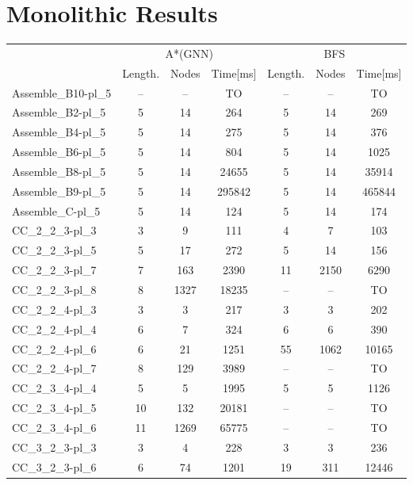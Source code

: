 \documentclass{article}
\newcommand{\BFSres}{BFS}
\newcommand{\GNNres}{A*(GNN)}
\newcommand{\planLength}{Length.}
\newcommand{\nodesExp}{Nodes}
\newcommand{\solvingTime}{Time}
\newcommand{\unsolvedColumn}{--}
\newcommand{\myTO}{TO}
\begin{document}
\section*{Monolithic Results}
\begin{longtable}[!ht]{l|ccc|ccc}
\centering
\multirow2{*}{\textbf{Instance Name}} & \multicolumn{3}{c|}{\GNNres} & \multicolumn{3}{c}{\BFSres} \\
\cline{2-7}
& \planLength & \nodesExp & \solvingTime [ms] & \planLength & \nodesExp & \solvingTime [ms] \\
\hline
Assemble\_B10-pl\_5 & \unsolvedColumn & \unsolvedColumn & \myTO & \unsolvedColumn & \unsolvedColumn & \myTO \\
Assemble\_B2-pl\_5 & 5 & 14 & 264 & 5 & 14 & 269 \\
Assemble\_B4-pl\_5 & 5 & 14 & 275 & 5 & 14 & 376 \\
Assemble\_B6-pl\_5 & 5 & 14 & 804 & 5 & 14 & 1025 \\
Assemble\_B8-pl\_5 & 5 & 14 & 24655 & 5 & 14 & 35914 \\
Assemble\_B9-pl\_5 & 5 & 14 & 295842 & 5 & 14 & 465844 \\
Assemble\_C-pl\_5 & 5 & 14 & 124 & 5 & 14 & 174 \\
CC\_2\_2\_3-pl\_3 & 3 & 9 & 111 & 4 & 7 & 103 \\
CC\_2\_2\_3-pl\_5 & 5 & 17 & 272 & 5 & 14 & 156 \\
CC\_2\_2\_3-pl\_7 & 7 & 163 & 2390 & 11 & 2150 & 6290 \\
CC\_2\_2\_3-pl\_8 & 8 & 1327 & 18235 & \unsolvedColumn & \unsolvedColumn & \myTO \\
CC\_2\_2\_4-pl\_3 & 3 & 3 & 217 & 3 & 3 & 202 \\
CC\_2\_2\_4-pl\_4 & 6 & 7 & 324 & 6 & 6 & 390 \\
CC\_2\_2\_4-pl\_6 & 6 & 21 & 1251 & 55 & 1062 & 10165 \\
CC\_2\_2\_4-pl\_7 & 8 & 129 & 3989 & \unsolvedColumn & \unsolvedColumn & \myTO \\
CC\_2\_3\_4-pl\_4 & 5 & 5 & 1995 & 5 & 5 & 1126 \\
CC\_2\_3\_4-pl\_5 & 10 & 132 & 20181 & \unsolvedColumn & \unsolvedColumn & \myTO \\
CC\_2\_3\_4-pl\_6 & 11 & 1269 & 65775 & \unsolvedColumn & \unsolvedColumn & \myTO \\
CC\_3\_2\_3-pl\_3 & 3 & 4 & 228 & 3 & 3 & 236 \\
CC\_3\_2\_3-pl\_6 & 6 & 74 & 1201 & 19 & 311 & 12446 \\

\end{longtable}
\end{document}
